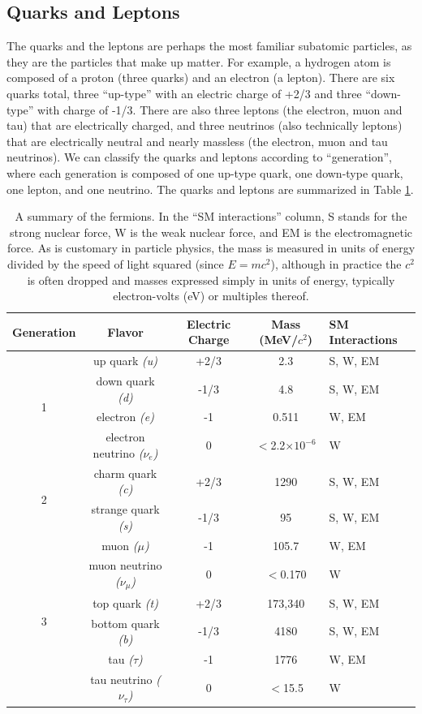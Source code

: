 \subsection{Quarks and Leptons}
The quarks and the leptons are perhaps the most familiar subatomic particles, as they 
are the particles that make up matter.  For example, a hydrogen atom is 
composed of a proton (three quarks) and an electron (a lepton).  
There are six quarks total, three ``up-type'' with an electric 
charge of +2/3 and three ``down-type'' with charge 
of -1/3.  There are also three leptons 
(the electron, muon and tau) that are electrically charged, and three neutrinos (also technically leptons) 
that are electrically neutral and nearly massless (the electron, muon and tau neutrinos).  
We can classify the quarks and leptons according to ``generation'', where each generation 
is composed of one up-type quark, one down-type quark, 
one lepton, and one neutrino.  The quarks and leptons are summarized in Table \ref{tab:QLTable}.

\begin{table}
	\caption{A summary of the fermions.  In the ``SM interactions'' column, 
    S stands for the strong nuclear force, W is the weak nuclear force, 
    and EM is the electromagnetic force.  As is customary in particle physics, 
    the mass is measured in units of energy divided by the speed of light squared 
    (since $E=mc^2$), although in practice the $c^2$ is often 
    dropped and masses expressed simply in units of energy, typically electron-volts (eV) or multiples thereof\cite{PDG-Review}. 	\label{tab:QLTable}}
	\begin{tabular}{| c || c | c | c | p{2cm} |}
		\hline
		Generation &  Flavor & Electric Charge & Mass (MeV/$c^2$) & SM Interactions\\
		\hline
		\multirow{4}{*}{1} & up quark \it{(u)} & +2/3 & 2.3 & S, W, EM\\
		    & down quark \it{(d)} & -1/3 & 4.8 & S, W, EM\\
		    & electron \it{(e)}& -1 & 0.511 & W, EM \\
		    & electron neutrino \it{($\nu_{e}$)} & 0 & $<$2.2$\times 10^{-6}$ & W\\
		\hline
		\multirow{2}{*}{2} & charm quark \it{(c)} & +2/3 & 1290 &  S, W, EM \\
		    & strange quark \it{(s)} & -1/3 & 95 & S, W, EM \\
		    & muon \it{($\mu$)} & -1& 105.7 & W, EM \\
		    & muon neutrino \it{($\nu_{\mu}$)} & 0 & $<$0.170 & W \\
		\hline 
		\multirow{2}{*}{3} & top quark \it{(t)} & +2/3 & 173,340 & S, W, EM \\
		    & bottom quark \it{(b)} & -1/3  & 4180 & S, W, EM \\ 
		    & tau \it{($\tau$)} & -1 & 1776 & W, EM\\
		    & tau neutrino \it{($\nu_{\tau}$)} & 0 & $<$15.5 & W\\		    
		\hline
	\end{tabular}
\end{table}


